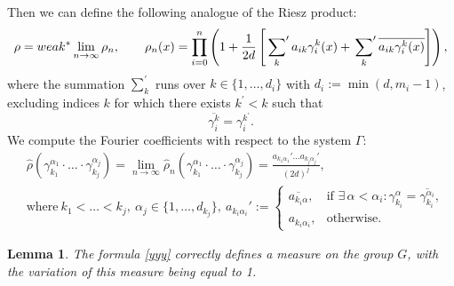 \documentclass[12pt]{article}
\newtheorem{lemma}{Lemma}
\begin{document}
Then we can define the following analogue of the Riesz product:
	\begin{equation} \label{yyy}
		\rho= weak^*\lim_{n \rightarrow\infty} \rho_n, \qquad  \rho_n(x)= \prod_{i=0}^{n}\left(1 + \frac{1}{2d}\left[\sideset{}{'}{\sum}_{k} a_{ik} \gamma_i^k(x) +  \sideset{}{'}{\sum}_{k} \overline{ a_{ik}\gamma_i^{k}(x)}\right]\right),
	\end{equation}
where the summation $\sum_{k}^{\prime}$ runs over $k \in \{1, \dots, d_i\}$ with $d_i := \min(d, m_i-1)$, excluding indices $k$ for which there exists $k^{\prime} < k$ such that
	\[
	\overline{\gamma_i^{k}} = \gamma_i^{k^{\prime}}.
	\]
We compute the Fourier coefficients with respect to the system $\Gamma$:
	\begin{equation} \label{rho-main}
		\begin{split}
			&\widehat{\rho}(\gamma_{k_1}^{\alpha_{1}} \cdot \ldots \cdot \gamma_{k_j}^{\alpha_{j}}) = \lim_{n\rightarrow \infty} 	\widehat{\rho}_n(\gamma_{k_1}^{\alpha_{1}} \cdot \ldots \cdot \gamma_{k_j}^{\alpha_{j}}) = \frac{a_{k_1\alpha_1}'\ldots a_{k_j\alpha_j}'}{(2d)^j}, \\
			& \text{where} \ k_1 < \ldots < k_j, \ \alpha_{j} \in \{1, \ldots, d_{k_j}\}, \ a_{k_i\alpha_i}' := 
			\begin{cases} 
				\overline{a_{k_i\alpha}}, & \text{if } \exists\, \alpha < \alpha_i : \gamma_{k_i}^{\alpha} = \overline{\gamma_{k_i}^{\alpha_i}}, \\ 
				a_{k_i\alpha_i}, & \text{otherwise}.
			\end{cases} 
		\end{split}
	\end{equation}
	\begin{lemma} The formula \eqref{yyy} correctly defines a measure on the group $G$, with the variation of this measure being equal to 1.
	\end{lemma}
\end{document}

